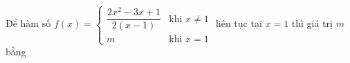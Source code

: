 \begin{ex}
Để hàm số $f(x)=\begin{cases}\dfrac{2x^2-3x+1}{2(x-1)}&\text{khi }x\ne1\\m&\text{khi }x=1\end{cases}$ liên tục tại $x=1$ thì giá trị $m$ bằng
\end{ex}
